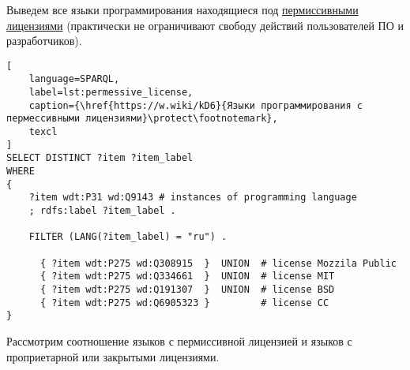 Выведем все языки программирования находящиеся под \href{https://en.wikipedia.org/wiki/Permissive_software_license}{пермиссивными лицензиями} (практически не ограничивают свободу действий пользователей ПО и разработчиков).

\begin{lstlisting}[
	language=SPARQL,
	label=lst:permessive_license,
	caption={\href{https://w.wiki/kD6}{Языки программирования с пермессивными лицензиями}\protect\footnotemark},
	texcl
]
SELECT DISTINCT ?item ?item_label
WHERE
{
    ?item wdt:P31 wd:Q9143 # instances of programming language
    ; rdfs:label ?item_label . 

    FILTER (LANG(?item_label) = "ru") . 
  
      { ?item wdt:P275 wd:Q308915  }  UNION  # license Mozzila Public
      { ?item wdt:P275 wd:Q334661  }  UNION  # license MIT
      { ?item wdt:P275 wd:Q191307  }  UNION  # license BSD
      { ?item wdt:P275 wd:Q6905323 }         # license CC
}
\end{lstlisting}

Рассмотрим соотношение языков с пермиссивной лицензией и языков с проприетарной или закрытыми лицензиями.

\pagebreak

